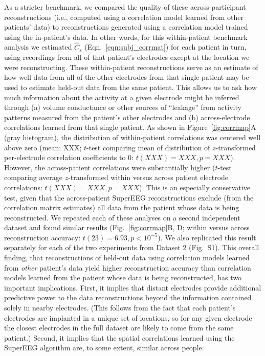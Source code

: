 \message{ !name(main.tex)}\documentclass[11pt]{article}
\newcommand{\perexpcorrmaps}{S1}
\begin{document}
{As a stricter benchmark, we compared the quality of these
across-participant reconstructions (i.e., computed using a correlation
model learned from other patients' data) to reconstructions generated
using a correlation model trained using the in-patient's data.  In
other words, for this within-patient benchmark analysis we estimated
$\hat{C}_{s}$ (Eqn.~\ref{eqn:subj_corrmat}) for each patient in turn,
using recordings from all of that patient's electrodes except at the
location we were reconstructing.  These within-patient reconstructions
serve as an estimate of how well data from all of the other electrodes
from that single patient may be used to estimate held-out data from
the same patient.  This allows us to ask how much information about
the activity at a given electrode might be inferred through (a) volume
conductance or other sources of ``leakage'' from activity patterns
measured from the patient's other electrodes and (b) across-electrode
correlations learned from that single patient.  As shown in
Figure~\ref{fig:corrmap}A (gray histogram), the distribution of
within-patient correlations was centered well above zero (mean: XXX;
$t$-test comparing mean of distribution of $z$-transformed
per-electrode correlation coefficients to 0: $t(XXX) = XXX, p = XXX$).
However, the across-patient correlations were substantially higher
($t$-test comparing average $z$-transformed within versus across
patient electrode correlations: $t(XXX) = XXX, p = XXX$).  This is an
especially conservative test, given that the across-patient SuperEEG
reconstructions exclude (from the correlation matrix estimates) all
data from the patient whose data is being reconstructed.  We repeated
each of these analyses on a second independent dataset and found
similar results (Fig.~\ref{fig:corrmap}B, D; within versus across
reconstruction accuracy: $t(23) = 6.93, p < 10^{-5}$). We also
replicated this result separately for each of the two experiments from
Dataset 2 (Fig.~\perexpcorrmaps).  This overall finding, that
reconstructions of held-out data using correlation models learned from
\textit{other} patient's data yield higher reconstruction accuracy
than correlation models learned from the patient whose data is being
reconstructed, has two important implications.  First, it implies that
distant electrodes provide additional predictive power to the data
reconstructions beyond the information contained solely in nearby
electrodes.  (This follows from the fact that each patient's
electrodes are implanted in a unique set of locations, so for any
given electrode the closest electrodes in the full dataset are likely
to come from the same patient.)  Second, it implies that the spatial
correlations learned using the SuperEEG algorithm are, to some extent,
similar across people.

}
\end{document}
